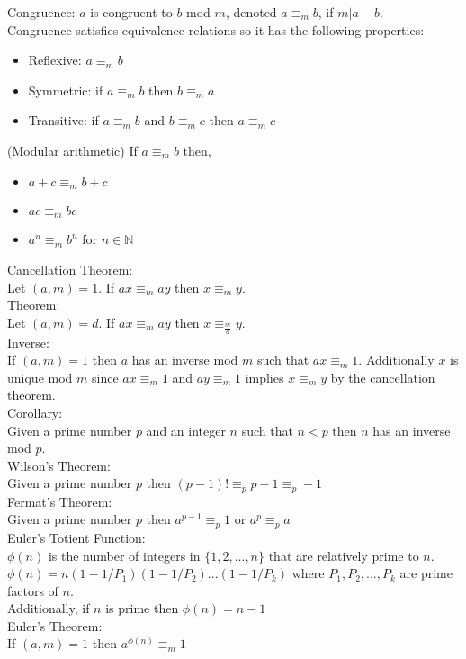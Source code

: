 \documentclass[12pt]{article}
\def \n{\mathbb{N}}
\def \no{\noindent}
\def \et{\phi (n)}
\def \m{\equiv_m}
\begin{document}
\no Congruence: $a$ is congruent to $b$ mod $m$, denoted $a \m b$, if $m | a-b$.\\

\no Congruence satisfies equivalence relations so it has the following properties:
\begin{itemize}
	\item[]Reflexive: $a \m b$
	\item[]Symmetric: if $a \m b$ then $b \m a$ 
	\item[]Transitive: if $a \m b$ and  $b \m c$ then $a \m c$ 
\end{itemize}

\no (Modular arithmetic) If $a \m b$ then,
\begin{itemize}
	\item[] $a + c \m b + c$
	\item[] $a c \m b c$
	\item[] $a^n \m b^n$ for $n \in \n$\\
\end{itemize}

\no Cancellation Theorem:\\
\hangindent=1cm Let $(a,m) = 1$. If $a x \m a y$ then $x \m y$.\\

\no Theorem:\\
\hangindent=1cm Let $(a,m) = d$. If $a x \m a y$ then $x \equiv_\frac md y$.\\

\no Inverse:\\
\hangindent=1cm If $(a,m) = 1$ then $a$ has an inverse mod $m$ such that $ax \m 1$. Additionally $x$ is unique mod $m$ since $ax \m 1$ and $ay \m 1$ implies $x \m y$ by the cancellation theorem.\\

\no Corollary:\\
\hangindent=1cm Given a prime number $p$ and an integer $n$ such that $n < p$ then $n$ has an inverse mod $p$.\\

\no Wilson's Theorem:\\
\hangindent=1cm Given a prime number $p$ then $ (p-1)! \equiv_p p-1 \equiv_p -1$\\

\no Fermat's Theorem:\\
\hangindent=1cm Given a prime number $p$ then $ a^{p-1} \equiv_p 1$ or $ a^p \equiv_p a$\\

\no Euler's Totient Function:\\
\hangindent=1cm $\et$ is the number of integers in $\{1,2,...,n \}$ that are relatively prime to $n$.\\ $\et = n(1-1/P_1)(1-1/P_2)...(1-1/P_k)$ where $P_1,P_2,...,P_k$ are  prime factors of $n$.\\ Additionally, if $n$ is prime then $\et = n - 1$\\

\no Euler's Theorem:\\
\hangindent=1cm If $(a,m) = 1$ then $a^{\et} \m 1$
\end{document}
